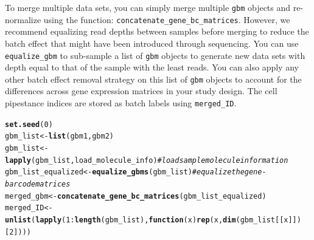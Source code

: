 \documentclass[10pt,oneside]{article}\usepackage[]{graphicx}\usepackage[]{color}
\makeatletter
\newcommand{\hlnum}[1]{\textcolor[rgb]{0.686,0.059,0.569}{#1}}%
\newcommand{\hlcom}[1]{\textcolor[rgb]{0.678,0.584,0.686}{\textit{#1}}}%
\newcommand{\hlopt}[1]{\textcolor[rgb]{0,0,0}{#1}}%
\newcommand{\hlstd}[1]{\textcolor[rgb]{0.345,0.345,0.345}{#1}}%
\newcommand{\hlkwa}[1]{\textcolor[rgb]{0.161,0.373,0.58}{\textbf{#1}}}%
\newcommand{\hlkwb}[1]{\textcolor[rgb]{0.69,0.353,0.396}{#1}}%
\newcommand{\hlkwc}[1]{\textcolor[rgb]{0.333,0.667,0.333}{#1}}%
\newcommand{\hlkwd}[1]{\textcolor[rgb]{0.737,0.353,0.396}{\textbf{#1}}}%
\newenvironment{kframe}{%
 \def\at@end@of@kframe{}%
 \ifinner\ifhmode%
  \def\at@end@of@kframe{\end{minipage}}%
  \begin{minipage}{\columnwidth}%
 \fi\fi%
 \def\FrameCommand##1{\hskip\@totalleftmargin \hskip-\fboxsep
 \colorbox{shadecolor}{##1}\hskip-\fboxsep
     \hskip-\linewidth \hskip-\@totalleftmargin \hskip\columnwidth}%
 \MakeFramed {\advance\hsize-\width
   \@totalleftmargin\z@ \linewidth\hsize
   \@setminipage}}%
 {\par\unskip\endMakeFramed%
 \at@end@of@kframe}
\newenvironment{knitrout}{}{} %
\makeatother
\begin{document}
To merge multiple data sets, you can simply merge multiple \verb!gbm! objects and re-normalize using the function: \verb!concatenate_gene_bc_matrices!. However, we recommend equalizing read depths between samples before merging to reduce the batch effect that might have been introduced through sequencing. You can use \verb!equalize_gbm! to sub-sample a list of \verb!gbm! objects to generate new data sets with depth equal to that of the sample with the least reads. You can also apply any other batch effect removal strategy on this list of \verb!gbm! objects to account for the differences across gene expression matrices in your study design. The cell pipestance indices are stored as batch labels using \verb!merged_ID!.
\begin{knitrout}
\color{fgcolor}\begin{kframe}
\begin{alltt}
\hlkwd{set.seed}\hlstd{(}\hlnum{0}\hlstd{)}
\hlstd{gbm_list} \hlkwb{<-} \hlkwd{list}\hlstd{(gbm1, gbm2)}
\hlstd{gbm_list} \hlkwb{<-} \hlkwd{lapply}\hlstd{(gbm_list,load_molecule_info)} \hlcom{# load sample molecule information}
\hlstd{gbm_list_equalized} \hlkwb{<-} \hlkwd{equalize_gbms}\hlstd{(gbm_list)}   \hlcom{# equalize the gene-barcode matrices}
\hlstd{merged_gbm} \hlkwb{<-} \hlkwd{concatenate_gene_bc_matrices}\hlstd{(gbm_list_equalized)}
\hlstd{merged_ID} \hlkwb{<-} \hlkwd{unlist}\hlstd{(}\hlkwd{lapply}\hlstd{(}\hlnum{1}\hlopt{:}\hlkwd{length}\hlstd{(gbm_list),} \hlkwa{function}\hlstd{(}\hlkwc{x}\hlstd{)} \hlkwd{rep}\hlstd{(x,}\hlkwd{dim}\hlstd{(gbm_list[[x]])[}\hlnum{2}\hlstd{])))}
\end{alltt}
\end{kframe}
\end{knitrout}
\end{document}

